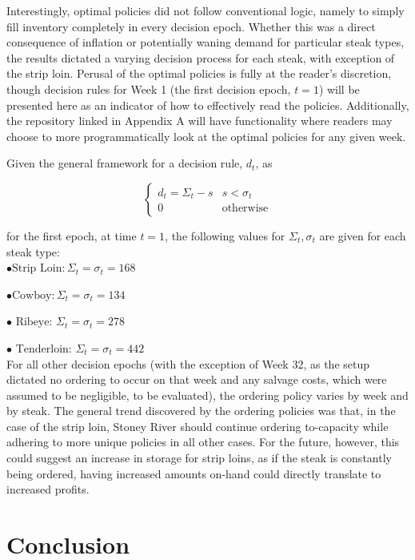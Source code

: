 \documentclass[12pt,a4paper]{article}
\begin{document}
Interestingly, optimal policies did not follow conventional logic, namely to simply fill inventory completely in every decision epoch. Whether this was a direct consequence of inflation or potentially waning demand for particular steak types, the results dictated a varying decision process for each steak, with exception of the strip loin. Perusal of the optimal policies is fully at the reader's discretion, though decision rules for Week 1 (the first decision epoch, $t = 1$) will be presented here as an indicator of how to effectively read the policies. Additionally, the repository linked in Appendix A will have functionality where readers may choose to more programmatically look at the optimal policies for any given week.

Given the general framework for a decision rule, $d_{t}$, as 

\begin{equation}
\begin{cases}
d_{t} = \Sigma_{t} - s & s < \sigma_{t} \\ 0 & \text{otherwise} 
\end{cases}
\end{equation}

for the first epoch, at time $t = 1$, the following values for $\Sigma_{t}, \sigma_{t}$ are given for each steak type:
\\

$ \bullet \text{Strip Loin}: \Sigma_{t} = \sigma_{t} = 168$ 

$ \bullet \text{Cowboy}: \Sigma_{t} = \sigma_{t} = 134$

$ \bullet \text{ Ribeye: } \Sigma_{t} = \sigma_{t} = 278  $

$ \bullet \text{ Tenderloin: } \Sigma_{t} = \sigma_{t} = 442  $
\\

For all other decision epochs (with the exception of Week 32, as the setup dictated no ordering to occur on that week and any salvage costs, which were assumed to be negligible, to be evaluated), the ordering policy varies by week and by steak. The general trend discovered by the ordering policies was that, in the case of the strip loin, Stoney River should continue ordering to-capacity while adhering to more unique policies in all other cases. For the future, however, this could suggest an increase in storage for strip loins, as if the steak is constantly being ordered, having increased amounts on-hand could directly translate to increased profits.

\section{Conclusion}
\end{document}
